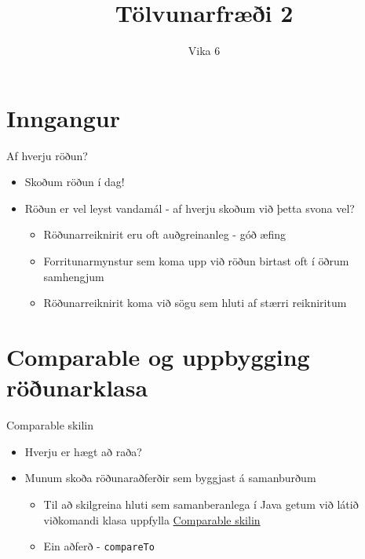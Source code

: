 \documentclass[handout]{beamer}
\title{Tölvunarfræði 2}
\subtitle{Vika 6}
\begin{document}
\begin{frame}
\titlepage
\end{frame}

\section{Inngangur}

\begin{frame}{Af hverju röðun?}
\begin{itemize}
 \item Skoðum röðun í dag!
 \item Röðun er vel leyst vandamál - af hverju skoðum við þetta svona vel?
 \begin{itemize}
  \item Röðunarreiknirit eru oft auðgreinanleg - góð æfing
  \item Forritunarmynstur sem koma upp við röðun birtast oft í öðrum samhengjum
  \item Röðunarreiknirit koma við sögu sem hluti af stærri reikniritum
 \end{itemize}
\end{itemize}
\end{frame}

\section{Comparable og uppbygging röðunarklasa}

\begin{frame}{Comparable skilin}
\begin{itemize}
 \item Hverju er hægt að raða?
 \item Munum skoða röðunaraðferðir sem byggjast á samanburðum
 \begin{itemize}
  \item Til að skilgreina hluti sem samanberanlega í Java getum við látið viðkomandi klasa uppfylla \href{https://docs.oracle.com/javase/8/docs/api/java/lang/Comparable.html}{Comparable skilin}
  \item Ein aðferð - \texttt{compareTo}
 \end{itemize}
\end{itemize}
\end{frame}
\end{document}
